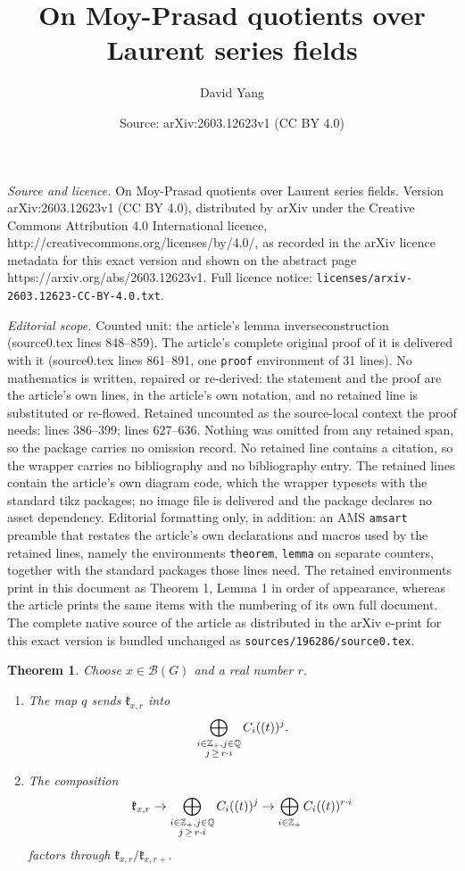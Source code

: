 \documentclass[10pt,a4paper]{amsart}
\title{On Moy-Prasad quotients over Laurent series fields}
\author{David Yang}
\date{Source: arXiv:2603.12623v1 (CC BY 4.0)}
\newtheorem{theorem}{Theorem}
\begin{document}
\maketitle

\noindent\emph{Source and licence.} On Moy-Prasad quotients over Laurent series fields. Version arXiv:2603.12623v1 (CC BY 4.0), distributed by arXiv under the Creative Commons Attribution 4.0 International licence, http://creativecommons.org/licenses/by/4.0/, as recorded in the arXiv licence metadata for this exact version and shown on the abstract page https://arxiv.org/abs/2603.12623v1. Full licence notice: \texttt{licenses/arxiv-2603.12623-CC-BY-4.0.txt}.\par\smallskip

\noindent\textit{Editorial scope.} Counted unit: the article's lemma inverseconstruction (source0.tex lines 848--859). The article's complete original proof of it is delivered with it (source0.tex lines 861--891, one \texttt{proof} environment of 31 lines). No mathematics is written, repaired or re-derived: the statement and the proof are the article's own lines, in the article's own notation, and no retained line is substituted or re-flowed.  Retained uncounted as the source-local context the proof needs: lines 386--399; lines 627--636.  Nothing was omitted from any retained span, so the package carries no omission record.  No retained line contains a citation, so the wrapper carries no bibliography and no bibliography entry.  The retained lines contain the article's own diagram code, which the wrapper typesets with the standard tikz packages; no image file is delivered and the package declares no asset dependency.  Editorial formatting only, in addition: an AMS \texttt{amsart} preamble that restates the article's own declarations and macros used by the retained lines, namely the environments \texttt{theorem}, \texttt{lemma} on separate counters, together with the standard packages those lines need.  The retained environments print in this document as Theorem 1, Lemma 1 in order of appearance, whereas the article prints the same items with the numbering of its own full document.  The complete native source of the article as distributed in the arXiv e-print for this exact version is bundled unchanged as \texttt{sources/196286/source0.tex}.
\begin{theorem}\label{depthcenter}
Choose $x\in\mathcal{B}(G)$ and a real number $r$.
\begin{enumerate}
\item The map $q$ sends $\mathfrak{k}_{x,r}$ into
\[
\displaystyle\bigoplus_{\substack{i\in\mathbb{Z}_+,j\in\mathbb{Q}\\ j\thinspace\geq\thinspace r\cdot i}}C_i((t))^j.
\]
\item The composition
\[
\mathfrak{k}_{x,r}\rightarrow\displaystyle\bigoplus_{\substack{i\in\mathbb{Z}_+,j\in\mathbb{Q}\\ j\thinspace\geq\thinspace r\cdot i}}C_i((t))^j\rightarrow\displaystyle\bigoplus_{i\in\mathbb{Z}_+}C_i((t))^{r\cdot i}
\]
factors through $\mathfrak{k}_{x,r}/\mathfrak{k}_{x,r+}.$
\end{enumerate}
\end{theorem}
\end{document}

